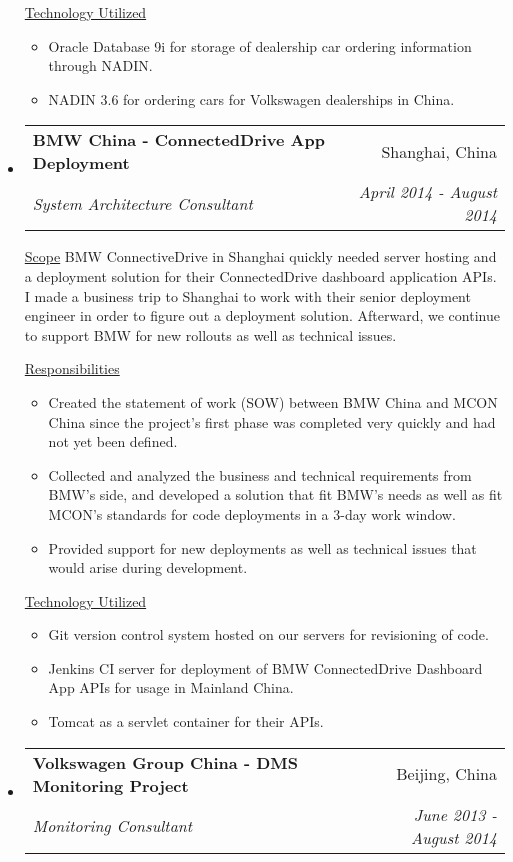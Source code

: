 \documentclass[a4paper,11pt]{article}
\makeatletter
\newcommand{\resitem}[1]{\item #1 \vspace{-2pt}}
\newcommand{\ressubheading}[4]{
\begin{tabular*}{6.5in}{l@{\cftdotfill{\cftsecdotsep}\extracolsep{\fill}}r}
        \textbf{#1} & #2 \\
        \textit{#3} & \textit{#4} \\
\end{tabular*}\vspace{-6pt}}
\makeatother
\begin{document}
\begin{itemize}
        \underline{Technology Utilized}
        \begin{itemize}
            \resitem{Oracle Database 9i for storage of dealership car ordering information through NADIN.}
            \resitem{NADIN 3.6 for ordering cars for Volkswagen dealerships in China.}
        \end{itemize}

    \item
        \ressubheading{BMW China - ConnectedDrive App Deployment}{Shanghai, China}{System Architecture Consultant}{April 2014 - August 2014}
        \linebreak
        \linebreak

        \underline{Scope}
        \linebreak
        \linebreak
        BMW ConnectiveDrive in Shanghai quickly needed server hosting and a deployment solution for their ConnectedDrive dashboard application APIs. I made a business trip to Shanghai to work with their senior deployment engineer in order to figure out a deployment solution. Afterward, we continue to support BMW for new rollouts as well as technical issues.

        \underline{Responsibilities}
        \begin{itemize}
            \resitem{Created the statement of work (SOW) between BMW China and MCON China since the project's first phase was completed very quickly and had not yet been defined.}
            \resitem{Collected and analyzed the business and technical requirements from BMW's side, and developed a solution that fit BMW's needs as well as fit MCON's standards for code deployments in a 3-day work window.}
            \resitem{Provided support for new deployments as well as technical issues that would arise during development.}
        \end{itemize}

        \underline{Technology Utilized}
        \begin{itemize}
            \resitem{Git version control system hosted on our servers for revisioning of code.}
            \resitem{Jenkins CI server for deployment of BMW ConnectedDrive Dashboard App APIs for usage in Mainland China.}
            \resitem{Tomcat as a servlet container for their APIs.}
        \end{itemize}

    \item
        \ressubheading{Volkswagen Group China - DMS Monitoring Project}{Beijing, China}{Monitoring Consultant}{June 2013 - August 2014}
        \linebreak
        \linebreak


\end{itemize}
\end{document}
